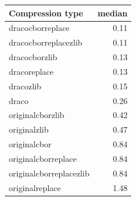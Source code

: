 \begin{table}[!h]
\begin{minipage}{.5\linewidth}
\begin{tabular}{|l|r|}
\hline
Compression type & median\\
\hline
dracocborreplace & 0.11\\
\hline
dracocborreplacezlib & 0.11\\
\hline
dracocborzlib & 0.13\\
\hline
dracoreplace & 0.13\\
\hline
dracozlib & 0.15\\
\hline
draco & 0.26\\
\hline
originalcborzlib & 0.42\\
\hline
originalzlib & 0.47\\
\hline
originalcbor & 0.84\\
\hline
originalcborreplace & 0.84\\
\hline
originalcborreplacezlib & 0.84\\
\hline
originalreplace & 1.48\\
\hline
\end{tabular}
\end{minipage} 
\end{table}
